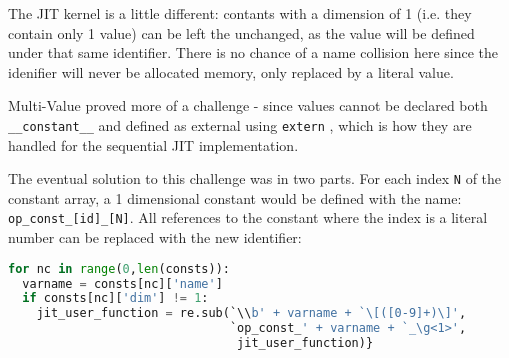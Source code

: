 The JIT kernel is a little different: contants with a dimension of 1 (i.e. they contain only 1 value) can be left the unchanged, as the value will be defined under that same identifier. There is no chance of a name collision here since the idenifier will never be allocated memory, only replaced by a literal value.
\par
Multi-Value proved more of a challenge - since values cannot be declared both \verb|__constant__| and defined as external using \verb|extern| \cite[p126]{guide}, which is how they are handled for the sequential JIT implementation.
\par
The eventual solution to this challenge was in two parts. For each index \verb|N| of the constant array, a 1 dimensional constant would be defined with the name: \verb|op_const_[id]_[N]|. All references to the constant where the index is a literal number can be replaced with the new identifier:
\begin{lstlisting}[backgroundcolor = \color{lightgray!20}, language=Python]
for nc in range(0,len(consts)):
  varname = consts[nc]['name']
  if consts[nc]['dim'] != 1:
    jit_user_function = re.sub(`\\b' + varname + `\[([0-9]+)\]',
                               `op_const_' + varname + `_\g<1>',
                                jit_user_function)}
\end{lstlisting}


